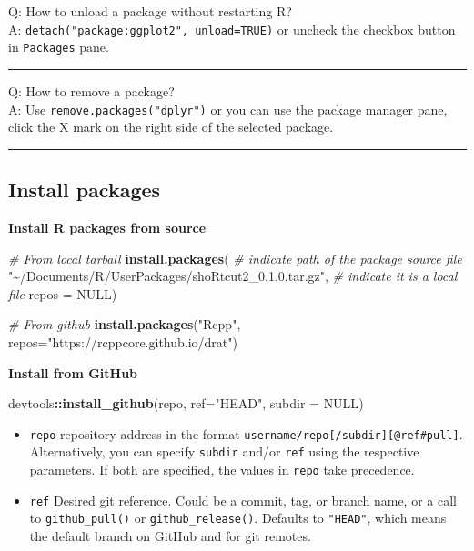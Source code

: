\documentclass[
  a4paper,
  twoside,
  openright]{book}
\newenvironment{Shaded}{\begin{snugshade}}{\end{snugshade}}
\newcommand{\AttributeTok}[1]{\textcolor[rgb]{0.13,0.29,0.53}{#1}}
\newcommand{\CommentTok}[1]{\textcolor[rgb]{0.56,0.35,0.01}{\textit{#1}}}
\newcommand{\ConstantTok}[1]{\textcolor[rgb]{0.56,0.35,0.01}{#1}}
\newcommand{\FunctionTok}[1]{\textcolor[rgb]{0.13,0.29,0.53}{\textbf{#1}}}
\newcommand{\NormalTok}[1]{#1}
\newcommand{\SpecialCharTok}[1]{\textcolor[rgb]{0.81,0.36,0.00}{\textbf{#1}}}
\newcommand{\StringTok}[1]{\textcolor[rgb]{0.31,0.60,0.02}{#1}}
\providecommand{\tightlist}{%
  \setlength{\itemsep}{0pt}\setlength{\parskip}{0pt}}
\theoremstyle{definition}
\theoremstyle{definition}
\theoremstyle{definition}
\theoremstyle{definition}
\theoremstyle{remark}
\begin{document}
Q: How to unload a package without restarting R?\\
A: \texttt{detach("package:ggplot2",\ unload=TRUE)} or uncheck the checkbox button in \texttt{Packages} pane.

\begin{center}\rule{0.5\linewidth}{0.5pt}\end{center}

Q: How to remove a package?\\
A: Use \texttt{remove.packages("dplyr")} or you can use the package manager pane, click the X mark on the right side of the selected package.

\begin{center}\rule{0.5\linewidth}{0.5pt}\end{center}

\subsection{Install packages}\label{install-packages}

\textbf{Install R packages from source}

\begin{Shaded}
\begin{Highlighting}[]
\CommentTok{\# From local tarball}
\FunctionTok{install.packages}\NormalTok{(}
  \CommentTok{\# indicate path of the package source file}
  \StringTok{"\textasciitilde{}/Documents/R/UserPackages/shoRtcut2\_0.1.0.tar.gz"}\NormalTok{, }
  \CommentTok{\# indicate it is a local file}
  \AttributeTok{repos =} \ConstantTok{NULL}\NormalTok{)}

\CommentTok{\# From github}
\FunctionTok{install.packages}\NormalTok{(}\StringTok{"Rcpp"}\NormalTok{, }\AttributeTok{repos=}\StringTok{"https://rcppcore.github.io/drat"}\NormalTok{)}
\end{Highlighting}
\end{Shaded}

\textbf{Install from GitHub}

\begin{Shaded}
\begin{Highlighting}[]
\NormalTok{devtools}\SpecialCharTok{::}\FunctionTok{install\_github}\NormalTok{(repo, }\AttributeTok{ref=}\StringTok{"HEAD"}\NormalTok{, }\AttributeTok{subdir =} \ConstantTok{NULL}\NormalTok{)}
\end{Highlighting}
\end{Shaded}

\begin{itemize}
\tightlist
\item
  \texttt{repo} repository address in the format \texttt{username/repo{[}/subdir{]}{[}@ref\textbar{}\#pull{]}}. Alternatively, you can specify \texttt{subdir} and/or \texttt{ref} using the respective parameters. If both are specified, the values in \texttt{repo} take precedence.
\item
  \texttt{ref} Desired git reference. Could be a commit, tag, or branch name, or a call to \texttt{github\_pull()} or \texttt{github\_release()}. Defaults to \texttt{"HEAD"}, which means the default branch on GitHub and for git remotes.
\end{itemize}
\end{document}
